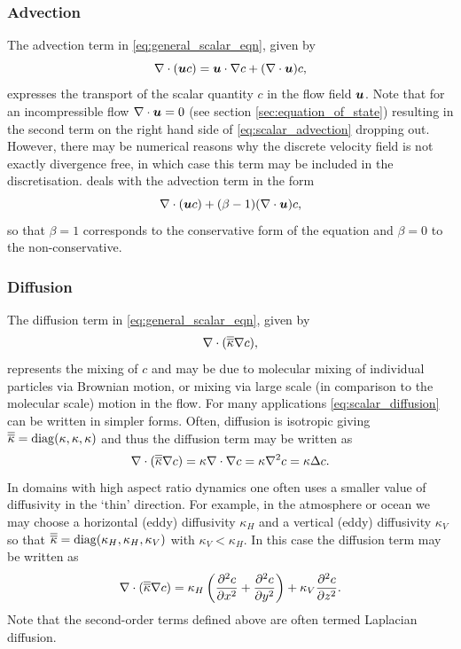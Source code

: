 \subsubsection{Advection}\label{sec:MP-AdvdifEqn-adv}
The advection term in \eqref{eq:general_scalar_eqn}, given by
\begin{equation}\label{eq:scalar_advection}
\nabla\cdot(\bmu c) = \bmu\cdot\nabla c + (\nabla\cdot\bmu)c,
\end{equation}
expresses the transport of the scalar quantity $c$ in the flow field $\bmu$. Note that for an incompressible flow $\nabla\cdot\bmu=0$ (see section \ref{sec:equation_of_state}) resulting in the second term on the right hand side of \eqref{eq:scalar_advection} dropping out. However, there may be numerical
reasons why the discrete velocity field is not exactly divergence free, in which case this term may
be included in the discretisation. {\fluidity} deals with the advection term in the form
\begin{equation}\label{eq:fluidity_scalar_advection}
\nabla\cdot(\bmu c) + (\beta-1)(\nabla\cdot\bmu)c,
\end{equation}
so that $\beta=1$ corresponds to the conservative form of the equation and $\beta=0$ to the non-conservative.

\subsubsection{Diffusion}\label{sec:MP-AdvdifEqn-diff}
The diffusion term in \eqref{eq:general_scalar_eqn}, given by 
\begin{equation}\label{eq:scalar_diffusion}
\nabla\cdot(\kaptens\nabla c),
\end{equation}
represents the mixing of $c$ and may be due to 
molecular mixing of individual particles via Brownian motion, or mixing via large scale (in comparison to the
molecular scale) motion in the flow. For many applications \eqref{eq:scalar_diffusion} can be written in simpler forms. Often, diffusion is isotropic giving $\kaptens = \mathrm{diag}(\kappa,\kappa,\kappa)$ and thus the diffusion term
may be written as
\begin{equation}\label{eq:scalar_isotropic_diffusion}
\nabla\cdot(\kaptens\nabla c) = \kappa\nabla\cdot\nabla c = \kappa\nabla^2 c = \kappa\Delta c.
\end{equation}
In domains with high aspect ratio dynamics one often uses a smaller value of diffusivity in the `thin'
direction. For example, in the atmosphere or ocean we may choose a horizontal (eddy) diffusivity $\kappa_H$ and a
vertical (eddy) diffusivity $\kappa_V$ so that $\kaptens = \mathrm{diag}(\kappa_H,\kappa_H,\kappa_V)$ with $\kappa_V < \kappa_H$.
In this case the diffusion term may be written as
\begin{equation}\label{eq:scalar_anisotropic_diffusion}
\nabla\cdot(\kaptens\nabla c) = \kappa_H \left(\pptt[x]{c} + \pptt[y]{c}\right) + \kappa_V \pptt[z]{c}.
\end{equation}
Note that the second-order terms defined above are often termed Laplacian diffusion.



